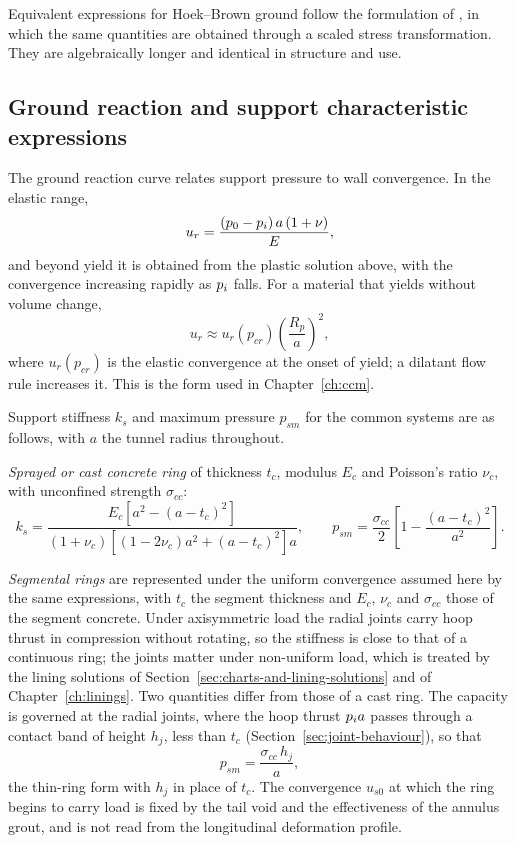Equivalent expressions for Hoek--Brown ground follow the formulation of
\citet{carranza2000ccm}, in which the same quantities are obtained through a
scaled stress transformation. They are algebraically longer and identical in
structure and use.

\subsection{Ground reaction and support characteristic expressions}
\label{sec:grc-scc-appendix}

The ground reaction curve relates support pressure to wall convergence. In the
elastic range,
\[
u_r = \frac{(p_0 - p_i)\,a\,(1+\nu)}{E},
\]
and beyond yield it is obtained from the plastic solution above, with the
convergence increasing rapidly as $p_i$ falls. For a material that yields
without volume change,
\[
u_r \approx u_r(p_{cr})\left(\frac{R_p}{a}\right)^{2} ,
\]
where $u_r(p_{cr})$ is the elastic convergence at the onset of yield; a
dilatant flow rule increases it. This is the form used in
Chapter~\ref{ch:ccm}.

Support stiffness $k_s$ and maximum pressure $p_{sm}$ for the common
systems are as follows, with $a$ the tunnel radius throughout.

\emph{Sprayed or cast concrete ring} of thickness $t_c$, modulus $E_c$ and
Poisson's ratio $\nu_c$, with unconfined strength $\sigma_{cc}$:
\[
k_s = \frac{E_c\left[a^2-(a-t_c)^2\right]}
{(1+\nu_c)\left[(1-2\nu_c)a^2+(a-t_c)^2\right]a},
\qquad
p_{sm} = \frac{\sigma_{cc}}{2}\left[1-\frac{(a-t_c)^2}{a^2}\right].
\]

\emph{Segmental rings} are represented under the uniform convergence assumed
here by the same expressions, with $t_c$ the segment thickness and $E_c$,
$\nu_c$ and $\sigma_{cc}$ those of the segment concrete. Under axisymmetric
load the radial joints carry hoop thrust in compression without rotating, so
the stiffness is close to that of a continuous ring; the joints matter under
non-uniform load, which is treated by the lining solutions of
Section~\ref{sec:charts-and-lining-solutions} and of
Chapter~\ref{ch:linings}. Two quantities differ from those of a cast ring.
The capacity is governed at the radial joints, where the hoop thrust $p_i a$
passes through a contact band of height $h_j$, less than $t_c$
(Section~\ref{sec:joint-behaviour}), so that
\[
p_{sm} = \frac{\sigma_{cc}\,h_j}{a} ,
\]
the thin-ring form with $h_j$ in place of $t_c$. The convergence $u_{s0}$
at which the ring begins to carry load is fixed by the tail void and the
effectiveness of the annulus grout, and is not read from the longitudinal
deformation profile.

